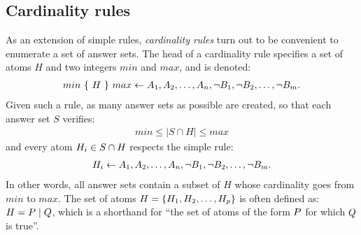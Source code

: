 \subsection{Cardinality rules}
\label{sssec:cardinality_rules}
As an extension of simple rules, \emph{cardinality rules} turn out to be convenient to enumerate a set of answer sets.
The head of a cardinality rule specifies a set of atoms $H$ and two integers $min$ and $max$, and is denoted:
\begin{align*}
  min\ \{\ H\ \}\ max \leftarrow A_1, A_2, \dots, A_n, \neg B_1, \neg B_2, \dots, \neg B_m.
\end{align*}
Given such a rule, as many answer sets as possible are created, so that each answer set $S$ verifies:
\begin{align*}
  min \leq |S \cap H| \leq max
\end{align*}
and every atom $H_i \in S \cap H$ respects the simple rule:
\begin{align*}
  H_i \leftarrow A_1, A_2, \dots, A_n, \neg B_1, \neg B_2, \dots, \neg B_m.
\end{align*}
In other words, all answer sets contain a subset of $H$ whose cardinality goes from $min$ to $max$.
The set of atoms $H = \{ H_1, H_2, \dots, H_p \}$ is often defined as: $H = P \mid Q$,
which is a shorthand for “the set of atoms of the form $P$ for which $Q$ is true”.

